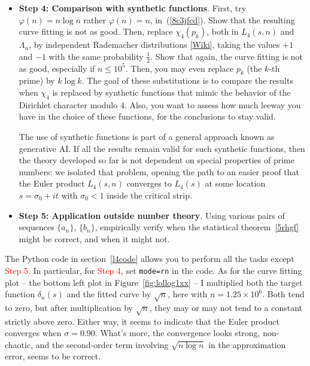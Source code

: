 \documentclass[oneside,10pt]{book}
\begin{document}
\begin{itemize}
\vspace{1ex}
\item[] {\bf Step 4: Comparison with synthetic functions}.  First, try $\varphi(n) = n\log n$ rather $\varphi(n) = n$, 
 in~(\ref{8c3jfcd}). Show that the resulting curve fitting is not as good. Then, replace $\chi_4(p_k)$, both
 in $L_4(s,n)$ and $\Lambda_n$, by independent  
\textcolor{index}{Rademacher distributions} 
 [\href{https://en.wikipedia.org/wiki/Rademacher_distribution}{Wiki}], taking the values $+1$ and $-1$ with the same probability $\frac{1}{2}$.
Show that again, the curve fitting is not as good, especially if $n\leq 10^5$. 
Then, you may even replace $p_k$ (the $k$-th prime) by $k\log k$.
The goal of  these substitutions is to compare the results
 when $\chi_4$ is replaced by \textcolor{index}{synthetic functions} that mimic the behavior of the  Dirichlet character modulo 4. Also, you want to assess how much leeway you have in the choice of these functions, for the conclusions to stay valid.
\vspace{1ex}

The use of synthetic functions is part of a general approach known as \textcolor{index}{generative AI}. If all
 the results remain valid for such synthetic functions, then the theory developed so far is not dependent on special properties of prime numbers: we isolated
 that problem, opening the path to an easier proof that the Euler product $L_4(s, n)$ converges to $L_4(s)$ at some location 
 $s = \sigma_0+ it$ with $\sigma_0 < 1$ inside the critical strip. 

\vspace{1ex}
\item[] {\bf Step 5: Application outside number theory}. Using various  pairs of sequences $\{a_n\}$, $\{b_n\}$, empirically verify when the statistical theorem~\ref{5rhgf} might be correct, and when it might not. 

\vspace{1ex}
\end{itemize}


\noindent The Python code in section~\ref{l4code} allows you to perform all the tasks except \textcolor{red}{Step 5}.
In particular, for \textcolor{red}{Step 4}, set \texttt{mode=\textquotesingle rn\textquotesingle} in the code. As for the curve fitting plot -- the bottom left plot in
 Figure~\ref{fig:lollog1xx} -- I multiplied both the target function $\delta_n(s)$ and the fitted curve by $\sqrt{n}$, here with $n = 1.25 \times 10^6$.
 Both tend to zero, but after multiplication by $\sqrt{n}$, they may or may not tend to a constant strictly above zero. Either way,
 it seems to indicate that the Euler product converges when $\sigma = 0.90$. What's more, the convergence looks strong, non-chaotic,
 and the second-order term involving $\sqrt{n\log n}$ in the approximation error, seems to be correct.  
\end{document}
